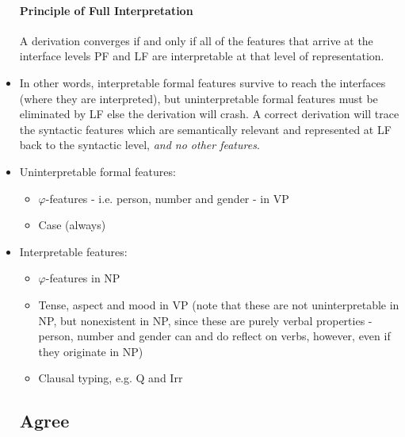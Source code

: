 \documentclass{article}
\begin{document}
\begin{itemize}
    \paragraph{Principle of Full Interpretation} A derivation converges if and only if all of the features that arrive at the interface levels PF and LF are interpretable at that level of representation.
    \item In other words, interpretable formal features survive to reach the interfaces (where they are interpreted), but uninterpretable formal features must be eliminated by LF else the derivation will crash. A correct derivation will trace the syntactic features which are semantically relevant and represented at LF back to the syntactic level, \textit{and no other features}.
    \item Uninterpretable formal features:
    \begin{itemize}
        \item $\varphi$-features - i.e. person, number and gender - in VP
        \item Case (always)
    \end{itemize}
    \item Interpretable features:
    \begin{itemize}
        \item $\varphi$-features in NP
        \item Tense, aspect and mood in VP (note that these are not uninterpretable in NP, but nonexistent in NP, since these are purely verbal properties - person, number and gender can and do reflect on verbs, however, even if they originate in NP)
        \item Clausal typing, e.g. Q and Irr
    \end{itemize}
    \subsection{Agree}

\end{itemize}
\end{document}
